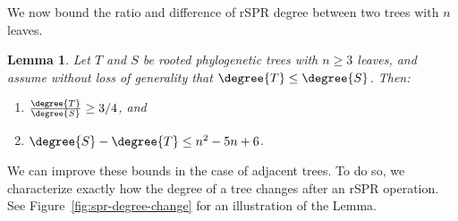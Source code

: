 \documentclass[11pt,onecolumn,conference]{IEEEtran}
\newtheorem{lemma}[theorem]{Lemma}
\newcommand{\cuttable}[2][]{%
    \ifthenelse{\equal{#1}{}}%
		{}%
		{#1}%
}
\begin{document}
We now bound the ratio and difference of rSPR degree between two trees with $n$ leaves.
\begin{lemma}
	\label{lem:degree_max_delta}
	Let $T$ and $S$ be rooted phylogenetic trees with $n \ge 3$ leaves, and assume without loss of generality that $\degree{T} \le \degree{S}$.
	Then:
	\begin{enumerate}
		\item $\frac{\degree{T}}{\degree{S}} \ge 3/4$, and
		\item $\degree{S} - \degree{T} \le n^2 - 5n + 6$.
	\end{enumerate}
\end{lemma}
\cuttable{
\begin{proof}
	To prove (i), we simply note from Lemma~\ref{lem:degree_extremes} that the ladder tree achieves the minimum degree, and the balanced tree achieves the maximum degree:
	\begin{align*}
		\frac{\degree{T}}{\degree{S}} \ge\ &\frac{3n^2 - 13n + 14}{4(n-2)^2 - 2 \sum_{m=1}^{n-2} \floor{\log_2(m+1)}} \\
		\ge\ &\frac{3n^2 - 13n + 12}{4(n-2)^2 - 2(n-2)} \\
		\cuttable{= \ &\frac{3n^2 - 13n + 12}{4n^2 - 16n + 16 - 2(n-2)} \\}
		= \ &\frac{3n^2 - 13n + 12}{4n^2 - 18n + 20} \\
		\cuttable{\ge\ &\frac{3n^2 - 13n + 12}{4n^2 - 17\frac{1}{3}n + 18} &\forall n \ge 3 \\}
	\end{align*}
	which is greater than 3/4 when $n \ge 3$.
    Similarly for (ii):
	\begin{align*}
		\cuttable{\degree{S} - \degree{T}
		\le\ &(4(n-2)^2 - 2 \sum_{m=1}^{n-2} \floor{\log_2(m+1)})
		- (3n^2 - 13n + 14) \\}
		\le\ &(4(n-2)^2 - 2(n-2)) - (3n^2 - 13n + 14) \\
		\cuttable{=\ &4n^2 - 16n + 16 - 2n +4 - 3n^2 + 13n - 14 \\}
		=\ &n^2 - 5n + 6.
	\end{align*}
\end{proof}
}

We can improve these bounds in the case of adjacent trees.
To do so, we \cuttable{require the following lemma that }characterize\cuttable{s} exactly how the degree of a tree changes after an rSPR operation.
See Figure~\ref{fig:spr-degree-change} for an illustration of the Lemma.
\end{document}
